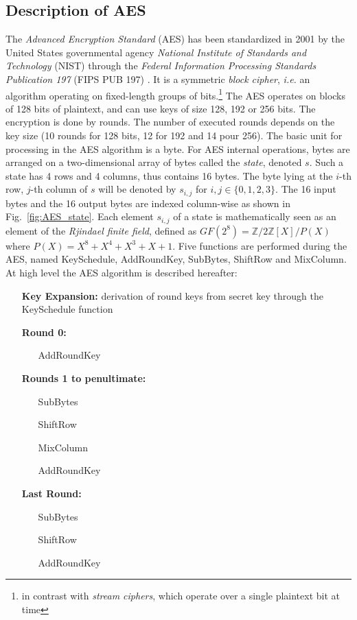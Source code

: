 \subsection{Description of AES}
The \emph{Advanced Encryption Standard} (AES) has been standardized in 2001 by the United States governmental agency \emph{National Institute of Standards and Technology} (NIST) through the \emph{Federal Information
Processing Standards Publication 197 } (FIPS PUB 197) \cite{nist197}. It is a symmetric \emph{block cipher}, \emph{i.e.} an algorithm operating on fixed-length groups of bits.\footnote{in contrast with \emph{stream ciphers}, which operate over a single plaintext bit at time} The AES operates on blocks of 128 bits of plaintext, and can use keys of size 128, 192 or 256 bits. The encryption is done by rounds. The number of executed rounds depends on the key size (10 rounds for 128 bits, 12 for 192 and 14 pour 256). The basic unit for processing in the AES algorithm is a byte. For AES internal operations, bytes are arranged on a two-dimensional array of bytes called the \emph{state}, denoted $s$. Such a state has 4 rows and 4 columns, thus contains 16 bytes. The byte lying at the $i$-th row, $j$-th column of $s$ will be denoted by $s_{i,j}$ for $i,j\in\{0,1,2,3\}$. The 16 input bytes and the 16 output bytes are indexed column-wise as shown in Fig.~\ref{fig:AES_state}. Each element $s_{i,j}$ of a state is mathematically seen as an element of the \emph{Rjindael finite field}, defined as $GF(2^8) = \mathbb{Z}/{2\mathbb{Z}[X]}/P(X)$ where $P(X) = X^8 + X^4 + X^3 + X + 1$. Five functions are performed during the AES, named KeySchedule, AddRoundKey, SubBytes, ShiftRow and MixColumn. At high level the AES algorithm is described hereafter:
\begin{itemize}
\item[\textbf{Key Expansion:}]  derivation of round keys from secret key through the KeySchedule function
\item[\textbf{Round 0:} ] 
\begin{itemize}
\item[] AddRoundKey
\end{itemize}
\item[\textbf{Rounds 1 to penultimate:}] 
\begin{itemize}
\item[] SubBytes
\item[] ShiftRow
\item[] MixColumn
\item[] AddRoundKey
\end{itemize}
\item[\textbf{Last Round:}] 
\begin{itemize}
\item[] SubBytes
\item[] ShiftRow
\item[] AddRoundKey
\end{itemize}
\end{itemize}

